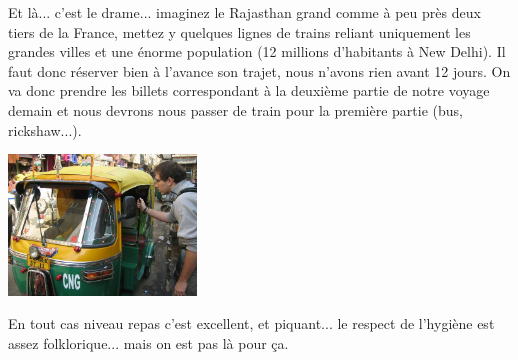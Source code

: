 \begin{multicols}{2}
Et là... c’est le drame... imaginez le Rajasthan grand comme à peu près deux tiers de la France, mettez y quelques lignes de trains reliant uniquement les grandes villes et une énorme population (12 millions d'habitants à New Delhi). Il faut donc réserver bien à l’avance son trajet, nous n’avons rien avant 12 jours.
On va donc prendre les billets correspondant à la deuxième partie de notre voyage demain et nous devrons nous passer de train pour la première partie (bus, rickshaw...).

\smallbreak
\hspace*{-0.65cm}
\includegraphics[width=5cm]{articles/Des-indiens-dans-la-ville/ricksaw.jpg}
\smallbreak


En tout cas niveau repas c’est excellent, et piquant... le respect de l’hygiène est assez folklorique... mais on est pas là pour ça.

\end{multicols}

\pagebreak
